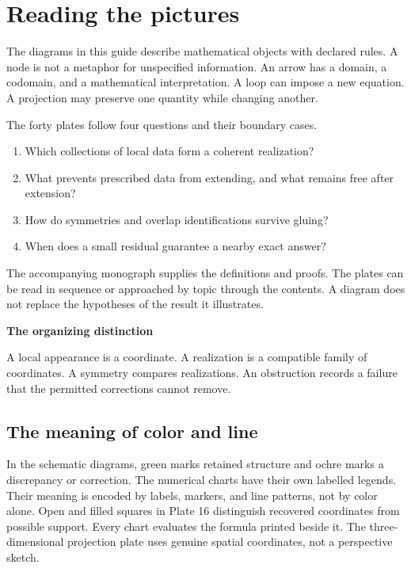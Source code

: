 \documentclass[11pt]{article}
\begin{document}
\KomorebiCover
{}
\begingroup
\makeatletter
\renewcommand{\@pnumwidth}{3em}
\renewcommand{\@tocrmarg}{4em}
\makeatother
\tableofcontents
\endgroup
\clearpage
{}
\section*{Reading the pictures}
The diagrams in this guide describe mathematical objects with declared rules. A node is not a metaphor for unspecified information. An arrow has a domain, a codomain, and a mathematical interpretation. A loop can impose a new equation. A projection may preserve one quantity while changing another.

The forty plates follow four questions and their boundary cases.
\begin{enumerate}
\item Which collections of local data form a coherent realization?
\item What prevents prescribed data from extending, and what remains free after extension?
\item How do symmetries and overlap identifications survive gluing?
\item When does a small residual guarantee a nearby exact answer?
\end{enumerate}

The accompanying monograph supplies the definitions and proofs. The plates can be read in sequence or approached by topic through the contents. A diagram does not replace the hypotheses of the result it illustrates.

\begin{insight}
\textbf{The organizing distinction}\par
A local appearance is a coordinate. A realization is a compatible family of coordinates. A symmetry compares realizations. An obstruction records a failure that the permitted corrections cannot remove.
\end{insight}

\subsection*{The meaning of color and line}
In the schematic diagrams, green marks retained structure and ochre marks a discrepancy or correction. The numerical charts have their own labelled legends. Their meaning is encoded by labels, markers, and line patterns, not by color alone. Open and filled squares in Plate 16 distinguish recovered coordinates from possible support. Every chart evaluates the formula printed beside it. The three-dimensional projection plate uses genuine spatial coordinates, not a perspective sketch.
\end{document}
